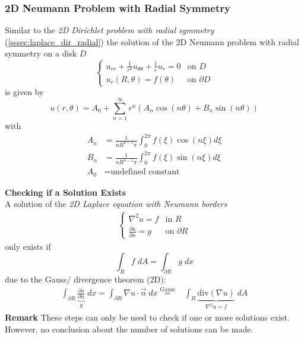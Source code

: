 \subsubsection{2D Neumann Problem with Radial Symmetry}\label{sssec:laplace_neu_rad}
Similar to the \textit{2D Dirichlet problem with radial symmetry} (\ref{sssec:laplace_dir_radial})
the solution of the 2D Neumann problem with radial symmetry on a disk $D$
\begin{equation*}
    \begin{cases}
        u_{rr} + \frac{1}{r^2}u_{\theta\theta}+\frac{1}{r}u_r = 0 & \text{on } D          \\
        u_r(R,\theta)=f(\theta)                                   & \text{on } \partial D
    \end{cases}
\end{equation*}
is given by
\begin{equation*}
    u(r,\theta)=A_0+\sum_{n=1}^\infty r^n(A_n\cos(n\theta)+B_n\sin(n\theta))
\end{equation*}
with
\begin{align*}
    A_n & =\frac{1}{nR^{n-1}\pi}\int_{0}^{2\pi}f(\xi)\cos(n\xi)d\xi \\
    B_n & =\frac{1}{nR^{n-1}\pi}\int_{0}^{2\pi}f(\xi)\sin(n\xi)d\xi \\
    A_0 & = \text{undefined constant}
\end{align*}

\textbf{Checking if a Solution Exists}\\
A solution of the \textit{2D Laplace equation with Neumann borders}
\begin{align*}
    \begin{cases}
        \nabla^2u=f                       & \text{in } R          \\
        \frac{\partial u}{\partial n} = g & \text{on } \partial R
    \end{cases}
\end{align*}
only exists if
\begin{equation*}
    \int_R f \;dA = \int_{\partial R} g \;dx
\end{equation*}
due to the Gauss/ divergence theorem (2D):
\begin{align*}
    \int_{\partial R} \underbrace{\frac{\partial u}{\partial n}}_{g}  \; dx
    =\int_{\partial R} \nabla u\cdot\vec{n}\; dx \overset{\text{Gauss}}{=} & \int_R \underbrace{\text{div}(\nabla u)}_{\nabla^2 u=f}\; dA
\end{align*}
\textbf{Remark} These steps can only be used to check if one or more solutions exist.
However, no conclusion about the number of solutions can be made.

